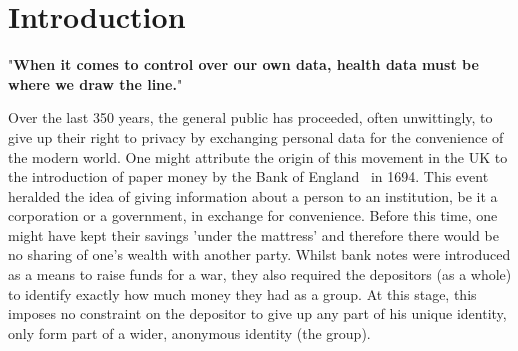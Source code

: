 \section{Introduction}

\begin{displayquote}{
  "\textbf{When it comes to control over our own data, health data must be where we draw the line.}"~\parencite{wilbankstopol:2016:article}
}\end{displayquote}

Over the last 350 years, the general public has proceeded, often unwittingly, to give up their right to privacy by exchanging personal data for the convenience of the modern world. One might attribute the origin of this movement in the UK to the introduction of paper money by the Bank of England~\parencite{bankofengland:2016:online} in 1694. This event heralded the idea of giving information about a person to an institution, be it a corporation or a government, in exchange for convenience. Before this time, one might have kept their savings 'under the mattress' and therefore there would be no sharing of one's wealth with another party. Whilst bank notes were introduced as a means to raise funds for a war, they also required the depositors (as a whole) to identify exactly how much money they had as a group. At this stage, this imposes no constraint on the depositor to give up any part of his unique identity, only form part of a wider, anonymous identity (the group).
